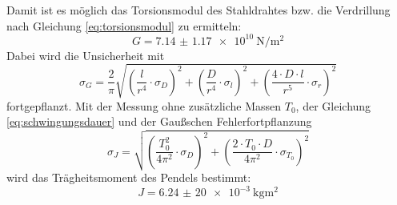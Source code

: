 Damit ist es möglich das Torsionsmodul des Stahldrahtes bzw. die Verdrillung nach Gleichung \eqref{eq:torsionsmodul} zu ermitteln:
\begin{equation*}
    G = \qty{7.14(117)e10}{\newton\per\square\meter}
\end{equation*}
Dabei wird die Unsicherheit mit
\begin{equation*}
    \sigma_G = \frac{2}{\pi} \sqrt{\left(\frac{l}{r^4} \cdot \sigma_D\right)^2 + \left(\frac{D}{r^4} \cdot \sigma_l\right)^2 + \left(\frac{4 \cdot D \cdot l}{r^5} \cdot \sigma_r\right)^2}
\end{equation*}
fortgepflanzt.
Mit der Messung ohne zusätzliche Massen $T_0$, der Gleichung \eqref{eq:schwingungsdauer} und der Gaußschen Fehlerfortpflanzung
\begin{equation*}
    \sigma_J = \sqrt{\left(\frac{T_0^2}{4 \pi^2} \cdot \sigma_D\right)^2 + \left(\frac{2 \cdot T_0 \cdot D}{4 \pi^2} \cdot \sigma_{T_0}\right)^2}
\end{equation*}
wird das Trägheitsmoment des Pendels bestimmt:
\begin{equation*}
    J = \qty{6,24(20)e-3}{\kilo\gram\meter\squared}
\end{equation*}
